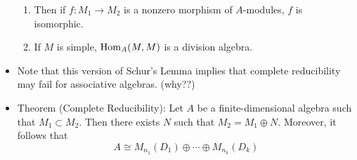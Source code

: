 \documentclass[../notes.tex]{subfiles}
\begin{document}
\begin{itemize}
\begin{enumerate}
        \item Then if $f:M_1\to M_2$ is a nonzero morphism of $A$-modules, $f$ is isomorphic.
        \item If $M$ is simple, $\operatorname{Hom}_A(M,M)$ is a division algebra.
    \end{enumerate}
    \item Note that this version of Schur's Lemma implies that complete reducibility may fail for associative algebras. (why??)
    \item Theorem (Complete Reducibility): Let $A$ be a finite-dimensional algebra such that $M_1\subset M_2$. Then there exists $N$ such that $M_2=M_1\oplus N$. Moreover, it follows that
    \begin{equation*}
        A \cong M_{n_1}(D_1)\oplus\cdots\oplus M_{n_k}(D_k)
    \end{equation*}
\end{itemize}
\end{document}
